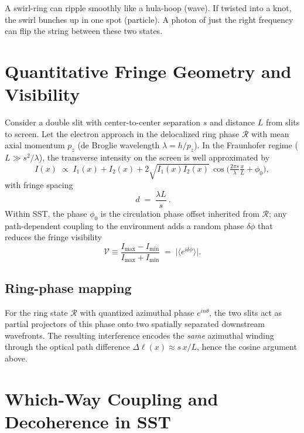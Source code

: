 \documentclass[11pt,a4paper]{article}
\begin{document}
A swirl-ring can ripple smoothly like a hula-hoop (wave).
If twisted into a knot, the swirl bunches up in one spot (particle).
A photon of just the right frequency can flip the string between these two states.


\section{Quantitative Fringe Geometry and Visibility}

Consider a double slit with center-to-center separation $s$ and distance $L$ from slits to screen.
Let the electron approach in the delocalized ring phase $\mathcal R$ with mean axial momentum $p_z$ (de Broglie wavelength $\lambda=h/p_z$).
In the Fraunhofer regime ($L \gg s^2/\lambda$), the transverse intensity on the screen is well approximated by
\begin{equation}
I(x) \;\propto\; I_1(x) + I_2(x) + 2\sqrt{I_1(x)I_2(x)}\,\cos\!\Big(\tfrac{2\pi s}{\lambda}\tfrac{x}{L} + \phi_0\Big),
\end{equation}
with fringe spacing
\begin{equation}
\boxed{\ d \;=\; \frac{\lambda L}{s}\ }.
\end{equation}
Within SST, the phase $\phi_0$ is the circulation phase offset inherited from $\mathcal R$; any path-dependent coupling to the environment adds a random phase $\delta\phi$ that reduces the fringe visibility
\begin{equation}
\mathcal V \equiv \frac{I_{\max}-I_{\min}}{I_{\max}+I_{\min}} \;=\; \big|\langle e^{i \delta\phi}\rangle\big|.
\end{equation}



\subsection{Ring-phase mapping}
    For the ring state $\mathcal R$ with quantized azimuthal phase $e^{i n\theta}$, the two slits act as partial projectors of this phase onto two spatially separated downstream wavefronts. The resulting interference encodes the \emph{same} azimuthal winding through the optical path difference $\Delta \ell(x) \approx s\,x/L$, hence the cosine argument above.

\section{Which-Way Coupling and Decoherence in SST}
\end{document}
